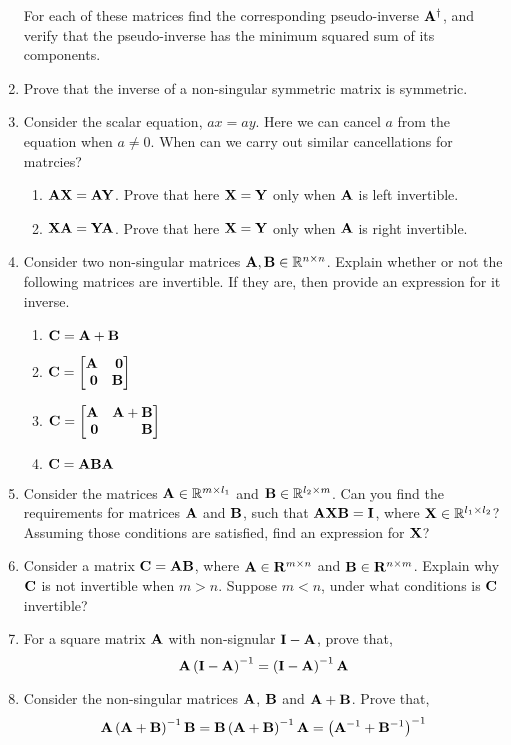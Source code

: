 \documentclass[12pt]{article}
\def\mf{\ensuremath\mathbf}
\def\mb{\ensuremath\mathbb}
\def\lp{\ensuremath\left(}
\def\rp{\ensuremath\right)}
\def\bmx{\ensuremath\begin{bmatrix*}[r]}
\def\emx{\ensuremath\end{bmatrix*}}
\begin{document}
\begin{enumerate}
    For each of these matrices find the corresponding pseudo-inverse $\mf{A}^{\dagger}$, and verify that the pseudo-inverse has the minimum squared sum of its components.

    \item Prove that the inverse of a non-singular symmetric matrix is symmetric.

    \item Consider the scalar equation, $ax = ay$. Here we can cancel $a$ from the equation when $a \neq 0$. When can we carry out similar cancellations for matrcies?
    \begin{enumerate}
        \item $\mf{A}\mf{X} = \mf{A}\mf{Y}$. Prove that here $\mf{X}=\mf{Y}$ only when $\mf{A}$ is left invertible.
        \item $\mf{X}\mf{A} = \mf{Y}\mf{A}$. Prove that here $\mf{X}=\mf{Y}$ only when $\mf{A}$ is right invertible.
    \end{enumerate}

    \item Consider two non-singular matrices $\mf{A}, \mf{B} \in \mb{R}^{n \times n}$. Explain whether or not the following matrices are invertible. If they are, then provide an expression for it inverse.
    \begin{enumerate}
        \item $\mf{C} = \mf{A} + \mf{B}$
        \item $\mf{C} = \bmx \mf{A} & \mf{0}\\\mf{0} & \mf{B}\emx$
        \item $\mf{C} = \bmx \mf{A} & \mf{A} + \mf{B}\\\mf{0} & \mf{B}\emx$
        \item $\mf{C} = \mf{A}\mf{B}\mf{A}$
    \end{enumerate}

    \item Consider the matrices $\mf{A} \in \mb{R}^{m \times l_1}$ and $\mf{B} \in \mb{R}^{l_2 \times m}$. Can you find the requirements for matrices $\mf{A}$ and $\mf{B}$, such that $\mf{A}\mf{X}\mf{B} = \mf{I}$, where $\mf{X} \in \mb{R}^{l_1 \times l_2}$? Assuming those conditions are satisfied,  find an expression for $\mf{X}$?

    \item Consider a matrix $\mf{C} = \mf{A}\mf{B}$, where $\mf{A} \in \mf{R}^{m \times n}$ and $\mf{B} \in \mf{R}^{n \times m}$. Explain why $\mf{C}$ is not invertible when $m > n$. Suppose $m < n$, under what conditions is $\mf{C}$ invertible?

    \item For a square matrix $\mf{A}$ with non-signular $\mf{I} - \mf{A}$, prove that,
    \[ \mf{A}\lp\mf{I} - \mf{A}\rp^{-1} = \lp\mf{I} - \mf{A}\rp^{-1}\mf{A} \]

    \item Consider the non-singular matrices $\mf{A}$, $\mf{B}$ and $\mf{A} + \mf{B}$. Prove that,
    \[ \mf{A}\lp\mf{A} + \mf{B}\rp^{-1}\mf{B} = \mf{B}\lp\mf{A} + \mf{B}\rp^{-1}\mf{A} = \lp\mf{A}^{-1} + \mf{B}^{-1}\rp^{-1} \]
\end{enumerate}
\end{document}

